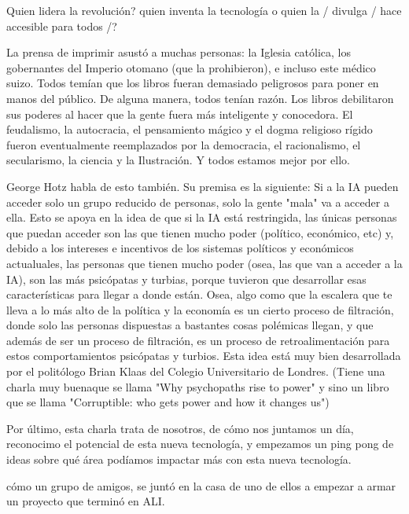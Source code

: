 Quien lidera la revolución? quien inventa la tecnología o quien la / divulga / hace accesible para todos /?



La prensa de imprimir asustó a muchas personas: la Iglesia católica, los gobernantes del Imperio otomano (que la prohibieron), e incluso este médico suizo.
Todos temían que los libros fueran demasiado peligrosos para poner en manos del público.
De alguna manera, todos tenían razón.
Los libros debilitaron sus poderes al hacer que la gente fuera más inteligente y conocedora.
El feudalismo, la autocracia, el pensamiento mágico y el dogma religioso rígido fueron eventualmente reemplazados por la democracia, el racionalismo, el secularismo, la ciencia y la Ilustración.
Y todos estamos mejor por ello.



George Hotz habla de esto también. Su premisa es la siguiente: Si a la IA pueden acceder solo un grupo reducido de personas, 
solo la gente "mala" va a acceder a ella. Esto se apoya en la idea de que si la IA está restringida, las únicas personas
que puedan acceder son las que tienen mucho poder (político, económico, etc) y, debido a los intereses e incentivos de
los sistemas políticos y económicos actualuales, las personas que tienen mucho poder (osea, las que van a acceder a la IA), 
son las más psicópatas y turbias, porque tuvieron que desarrollar esas características para llegar a donde están. Osea, 
algo como que la escalera que te lleva a lo más alto de la política y la economía es un cierto proceso de filtración, 
donde solo las personas dispuestas a bastantes cosas polémicas llegan, y que además de ser un proceso de filtración, 
es un proceso de retroalimentación para estos comportamientos psicópatas y turbios. Esta idea está muy bien desarrollada
por el politólogo Brian Klaas del Colegio Universitario de Londres. (Tiene una charla muy buenaque se llama "Why
psychopaths rise to power" y sino un libro que se llama "Corruptible: who gets power and how it changes us")







Por último, esta charla trata de nosotros, de cómo nos juntamos un día, reconocimo el potencial de esta nueva tecnología, 
y empezamos un ping pong de ideas sobre qué área podíamos impactar más con esta nueva tecnología. 


cómo un grupo de amigos, se juntó en la casa de uno de ellos a empezar a armar un proyecto que terminó en ALI. 


